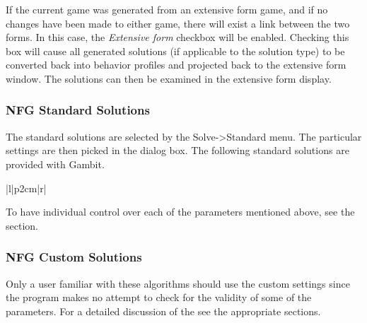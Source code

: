 If the current game was generated from an extensive form game, and if no
changes have been made to either game, there will exist a link between the
two forms.  In this case, the {\em Extensive form} checkbox will be
enabled.  Checking this box will cause all generated solutions (if
applicable to the solution type) to be converted back into behavior
profiles and projected back to the extensive form window.  The solutions
can then be examined in the extensive form display.

\subsubsection{NFG Standard Solutions}\label{NFGStandardSolutions}
The standard solutions are selected by the Solve->Standard menu.  The
particular settings are then picked in the dialog box.
The following standard solutions are provided with Gambit.

\begin{tabular}{|l|p{2cm}|r|}
\hline
{}
 \hline
\end{tabular}

To have individual control over each of the parameters mentioned above, see
the  section.

\subsubsection{NFG Custom Solutions}\label{NFGCustomSolutions}
Only a user familiar with these algorithms should use the custom settings
since the program makes no attempt to check for the validity of some of
the parameters.  For a detailed discussion of the 
 see the appropriate sections.

